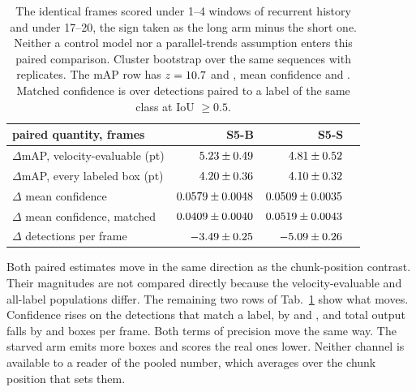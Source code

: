 \documentclass[10pt,twocolumn,letterpaper]{article}
\begin{document}
\begin{table}[h]
\centering\footnotesize
\setlength{\tabcolsep}{3.0pt}\renewcommand{\arraystretch}{0.95}
\begin{tabular}{lrrr}
\toprule
paired quantity, \ssmPairedN{} frames & S5-B & S5-S \\
\midrule
$\Delta$mAP, velocity-evaluable (pt) & $5.23\pm0.49$ & $4.81\pm0.52$ \\
$\Delta$mAP, every labeled box (pt) & $4.20\pm0.36$ & $4.10\pm0.32$ \\
$\Delta$ mean confidence & $0.0579\pm0.0048$ & $0.0509\pm0.0035$ \\
$\Delta$ mean confidence, matched & $0.0409\pm0.0040$ & $0.0519\pm0.0043$ \\
$\Delta$ detections per frame & $-3.49\pm0.25$ & $-5.09\pm0.26$ \\
\bottomrule
\end{tabular}
\caption{The identical frames scored under 1--4 windows of recurrent history and
under 17--20, the sign taken as the long arm minus the short one. Neither a
control model nor a parallel-trends assumption enters this paired comparison. Cluster bootstrap over the same
\outSeqsScanned{} sequences with \ssmPairedB{} replicates. The mAP row has
$z=10.7{}$ and \ssmPairedMapVelSmallZ{}, mean confidence
\ssmPairedConfBaseZ{} and \ssmPairedConfSmallZ{}. Matched confidence is over detections paired to a label of the same
class at IoU $\ge 0.5$.}
\label{tab:paired}
\end{table}

Both paired estimates move in the same direction as the chunk-position contrast. Their magnitudes
are not compared directly because the velocity-evaluable and all-label populations differ.
The remaining two rows of Tab.~\ref{tab:paired} show what moves. Confidence rises on the detections that
match a label, by \ssmPairedConfTpBase{} and \ssmPairedConfTpSmall{}, and total output
falls by \ssmPairedDpfBase{} and \ssmPairedDpfSmall{} boxes per frame. Both terms of
precision move the same way. The starved arm emits more boxes and scores the real ones
lower. Neither channel is available to a reader of the pooled number, which averages over
the chunk position that sets them.
\end{document}
